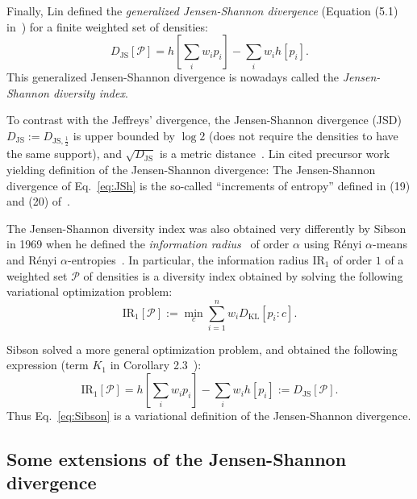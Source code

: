 \documentclass[11pt]{article}
\def\KL{\mathrm{KL}}
\def\calP{\mathcal{P}}
\def\KL{\mathrm{KL}}
\def\JS{\mathrm{JS}}
\def\IR{\mathrm{IR}}
\begin{document}
Finally, Lin defined the {\em generalized Jensen-Shannon divergence} (Equation (5.1) in~\cite{JS-1991}) for a finite weighted set of densities:
$$
D_\JS[\calP]=h\left[\sum_i w_ip_i\right]-\sum_i w_i h[p_i].
$$
This generalized Jensen-Shannon divergence is nowadays called the {\em Jensen-Shannon diversity index}.

To contrast with the Jeffreys' divergence, the Jensen-Shannon divergence (JSD) $D_\JS:=D_{\JS,\frac{1}{2}}$ is upper bounded by $\log 2$ (does not require the densities to have the same support), and $\sqrt{D_\JS}$ is 
a metric distance~\cite{JSmetric-2003,JSmetric-2004}.
Lin cited precursor work~\cite{WongYOU-1985,JW-1988} yielding definition of the Jensen-Shannon divergence:
The Jensen-Shannon divergence  of Eq.~\ref{eq:JSh} is the so-called ``increments of entropy'' defined in (19) and (20) of~\cite{WongYOU-1985}.

The Jensen-Shannon diversity index was also obtained very differently by Sibson in 1969 when he defined the {\em information radius}~\cite{Sibson-1969} of order $\alpha$ using R\'enyi $\alpha$-means and R\'enyi $\alpha$-entropies~\cite{Renyi-1961}.
In particular, the information radius $\IR_1$ of order $1$ of a weighted set $\calP$ of densities is a diversity index obtained by solving the following variational optimization problem:
\begin{equation}
\IR_{1}[\calP]:=\min_{c} \sum_{i=1}^n w_i D_\KL[p_i:c].  \label{eq:Sibson}
\end{equation}

Sibson solved a more general optimization problem, and obtained the following expression (term $K_1$ in Corollary 2.3~\cite{Sibson-1969}):
$$
\IR_{1}[\calP]=  h\left[\sum_i w_ip_i\right]-\sum_i w_i h[p_i]:=D_\JS[\calP].
$$
Thus Eq.~\ref{eq:Sibson} is a variational definition of the Jensen-Shannon divergence.

\subsection{Some extensions of the Jensen-Shannon divergence}
\end{document}
